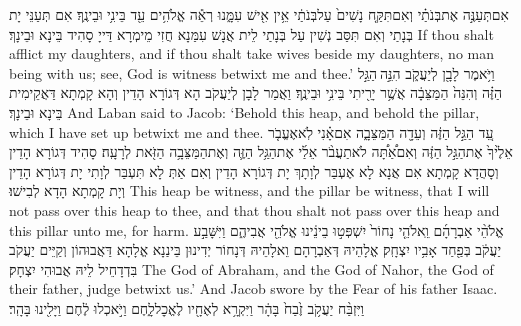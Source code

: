 {אִם\maqqaf תְּעַנֶּ֣ה אֶת\maqqaf בְּנֹתַ֗י וְאִם\maqqaf תִּקַּ֤ח נָשִׁים֙ עַל\maqqaf בְּנֹתַ֔י אֵ֥ין אִ֖ישׁ עִמָּ֑נוּ רְאֵ֕ה אֱלֹהִ֥ים עֵ֖ד בֵּינִ֥י וּבֵינֶֽךָ׃}
{אִם תְּעַנֵּי יָת בְּנָתַי וְאִם תִּסַּב נְשִׁין עַל בְּנָתַי לֵית אֲנָשׁ עִמַּנָא חֲזִי מֵימְרָא דַּייָ סָהִיד בֵּינָא וּבֵינָךְ׃}
{If thou shalt afflict my daughters, and if thou shalt take wives beside my daughters, no man being with us; see, God is witness betwixt me and thee.’}{}
{וַיֹּ֥אמֶר לָבָ֖ן לְיַעֲקֹ֑ב הִנֵּ֣ה \legarmeh  הַגַּ֣ל הַזֶּ֗ה וְהִנֵּה֙ הַמַּצֵּבָ֔ה אֲשֶׁ֥ר יָרִ֖יתִי בֵּינִ֥י וּבֵינֶֽךָ׃}
{וַאֲמַר לָבָן לְיַעֲקֹב הָא דְּגוֹרָא הָדֵין וְהָא קָמְתָא דַּאֲקֵימִית בֵּינָא וּבֵינָךְ׃}
{And Laban said to Jacob: ‘Behold this heap, and behold the pillar, which I have set up betwixt me and thee.}{}
{עֵ֚ד הַגַּ֣ל הַזֶּ֔ה וְעֵדָ֖ה הַמַּצֵּבָ֑ה אִם\maqqaf אָ֗נִי לֹֽא\maqqaf אֶעֱבֹ֤ר אֵלֶ֙יךָ֙ אֶת\maqqaf הַגַּ֣ל הַזֶּ֔ה וְאִם\maqqaf אַ֠תָּ֠ה לֹא\maqqaf תַעֲבֹ֨ר אֵלַ֜י אֶת\maqqaf הַגַּ֥ל הַזֶּ֛ה וְאֶת\maqqaf הַמַּצֵּבָ֥ה הַזֹּ֖את לְרָעָֽה׃}
{סָהִיד דְּגוֹרָא הָדֵין וְסָהֲדָא קָמְתָא אִם אֲנָא לָא אֶעְבַּר לְוָתָךְ יָת דְּגוֹרָא הָדֵין וְאִם אַתְּ לָא תִּעְבַּר לְוָתִי יָת דְּגוֹרָא הָדֵין וְיָת קָמְתָא הָדָא לְבִישׁוּ׃}
{This heap be witness, and the pillar be witness, that I will not pass over this heap to thee, and that thou shalt not pass over this heap and this pillar unto me, for harm.}{}
{אֱלֹהֵ֨י אַבְרָהָ֜ם וֵֽאלֹהֵ֤י נָחוֹר֙ יִשְׁפְּט֣וּ בֵינֵ֔ינוּ אֱלֹהֵ֖י אֲבִיהֶ֑ם וַיִּשָּׁבַ֣ע יַעֲקֹ֔ב בְּפַ֖חַד אָבִ֥יו יִצְחָֽק׃}
{אֱלָהֵיהּ דְּאַבְרָהָם וֵאלָהֵיהּ דְּנָחוֹר יְדִינוּן בֵּינַנָא אֱלָהָא דַּאֲבוּהוֹן וְקַיֵּים יַעֲקֹב בִּדְדָחֵיל לֵיהּ אֲבוּהִי יִצְחָק׃}
{The God of Abraham, and the God of Nahor, the God of their father, judge betwixt us.’ And Jacob swore by the Fear of his father Isaac.}{}
{וַיִּזְבַּ֨ח יַעֲקֹ֥ב זֶ֙בַח֙ בָּהָ֔ר וַיִּקְרָ֥א לְאֶחָ֖יו לֶאֱכׇל\maqqaf לָ֑חֶם וַיֹּ֣אכְלוּ לֶ֔חֶם וַיָּלִ֖ינוּ בָּהָֽר׃}

